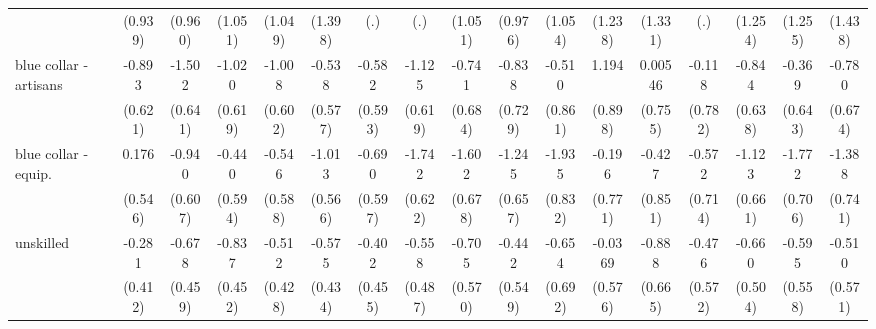 {\begin{tabular}{l*{16}{c}}
                    &     (0.939)         &     (0.960)         &     (1.051)         &     (1.049)         &     (1.398)         &         (.)         &         (.)         &     (1.051)         &     (0.976)         &     (1.054)         &     (1.238)         &     (1.331)         &         (.)         &     (1.254)         &     (1.255)         &     (1.438)         \\
[1em]
blue collar - artisans&      -0.893         &      -1.502\sym{*}  &      -1.020         &      -1.008         &      -0.538         &      -0.582         &      -1.125         &      -0.741         &      -0.838         &      -0.510         &       1.194         &     0.00546         &      -0.118         &      -0.844         &      -0.369         &      -0.780         \\
                    &     (0.621)         &     (0.641)         &     (0.619)         &     (0.602)         &     (0.577)         &     (0.593)         &     (0.619)         &     (0.684)         &     (0.729)         &     (0.861)         &     (0.898)         &     (0.755)         &     (0.782)         &     (0.638)         &     (0.643)         &     (0.674)         \\
[1em]
blue collar - equip.&       0.176         &      -0.940         &      -0.440         &      -0.546         &      -1.013         &      -0.690         &      -1.742\sym{**} &      -1.602\sym{*}  &      -1.245         &      -1.935\sym{*}  &      -0.196         &      -0.427         &      -0.572         &      -1.123         &      -1.772\sym{*}  &      -1.388         \\
                    &     (0.546)         &     (0.607)         &     (0.594)         &     (0.588)         &     (0.566)         &     (0.597)         &     (0.622)         &     (0.678)         &     (0.657)         &     (0.832)         &     (0.771)         &     (0.851)         &     (0.714)         &     (0.661)         &     (0.706)         &     (0.741)         \\
[1em]
unskilled           &      -0.281         &      -0.678         &      -0.837         &      -0.512         &      -0.575         &      -0.402         &      -0.558         &      -0.705         &      -0.442         &      -0.654         &     -0.0369         &      -0.888         &      -0.476         &      -0.660         &      -0.595         &      -0.510         \\
                    &     (0.412)         &     (0.459)         &     (0.452)         &     (0.428)         &     (0.434)         &     (0.455)         &     (0.487)         &     (0.570)         &     (0.549)         &     (0.692)         &     (0.576)         &     (0.665)         &     (0.572)         &     (0.504)         &     (0.558)         &     (0.571)         \\

\end{tabular}}
